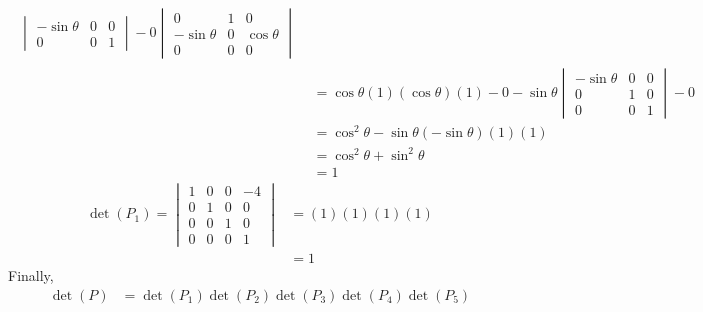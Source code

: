 \documentclass[11pt]{article}
\begin{document}
\begin{enumerate}[label=\textbf{\arabic*.}]
{\begin{enumerate}[label=\textbf{(\alph*)}]
{\begin{align*}
\begin{split}
\begin{vmatrix}
                                -\sin\theta & 0 & 0 \\
                                0           & 0 & 1
                            \end{vmatrix}
                            -
                            0\begin{vmatrix}
                                0           & 1 & 0          \\
                                -\sin\theta & 0 & \cos\theta \\
                                0           & 0 & 0
                            \end{vmatrix}
                        \end{split}                     \\
                         & =\cos\theta(1)(\cos\theta)(1)-0-
                        \sin\theta\begin{vmatrix}
                            -\sin\theta & 0 & 0 \\
                            0           & 1 & 0 \\
                            0           & 0 & 1
                        \end{vmatrix}
                        -0                                             \\
                         & =\cos^2\theta-\sin\theta(-\sin\theta)(1)(1) \\
                         & =\cos^2\theta+\sin^2\theta                  \\
                         & = 1
                    \end{align*}
                    \begin{align*}
                        \det(P_1)=
                        \begin{vmatrix}
                            1 & 0 & 0 & -4 \\
                            0 & 1 & 0 & 0  \\
                            0 & 0 & 1 & 0  \\
                            0 & 0 & 0 & 1
                        \end{vmatrix} & =(1)(1)(1)(1) \\
                                                   & =1
                    \end{align*}
                    Finally,
                    \begin{align*}
                        \det(P) & =\det(P_1)\det(P_2)\det(P_3)\det(P_4)\det(P_5) \\

\end{align*}}
\end{enumerate}}
\end{enumerate}
\end{document}

